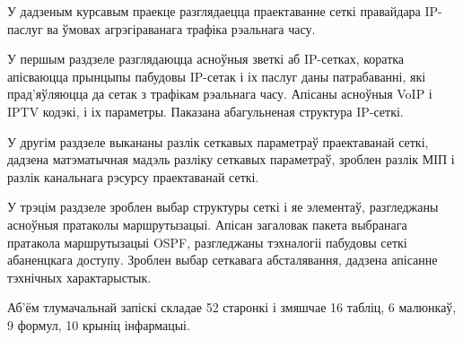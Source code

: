 \thispagestyle{empty} %

У дадзеным курсавым праекце разглядаецца праектаванне сеткі правайдара
IP-паслуг ва ўмовах агрэгіраванага трафіка рэальнага часу.

У першым раздзеле разглядаюцца асноўныя зветкі аб IP-сетках, коратка
апісваюцца прынцыпы пабудовы IP-сетак і іх паслуг даны патрабаванні, які
прад'яўляюцца да сетак з трафікам рэальнага часу. Апісаны асноўныя
VoIP і IPTV кодэкі, і іх параметры. Паказана абагульненая структура IP-сеткі.

У другім раздзеле выкананы разлік сеткавых параметраў праектаванай сеткі,
дадзена матэматычная мадэль разліку сеткавых параметраў, зроблен разлік
МІП і разлік канальнага рэсурсу праектаванай сеткі.

У трэцім раздзеле зроблен выбар структуры сеткі і яе элементаў,
разгледжаны асноўныя пратаколы маршрутызацыі. Апісан загаловак пакета
выбранага пратакола маршрутызацыі OSPF, разгледжаны тэхналогіі
пабудовы сеткі абаненцкага доступу. Зроблен выбар сеткавага абсталявання, дадзена апісанне тэхнічных характарыстык.

Аб'ём тлумачальнай запіскі складае 52 старонкі і змяшчае
16 табліц, 6 малюнкаў, 9 фор\-мул, 10 крыніц інфармацыі.
